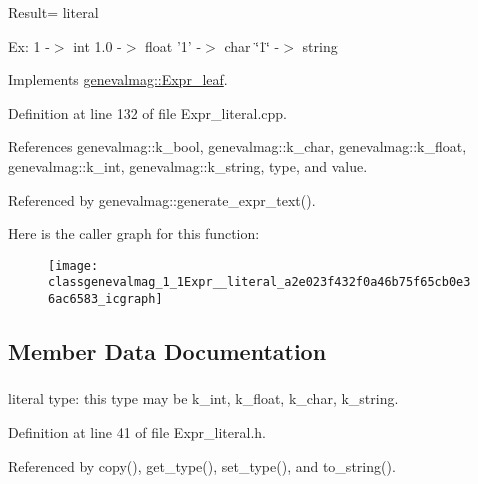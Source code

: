 Result= literal

Ex: 1 -\/$>$ int 1.0 -\/$>$ float '1' -\/$>$ char \char`\"{}1\char`\"{} -\/$>$ string 

Implements \hyperlink{classgenevalmag_1_1Expr__leaf_a96854f59a155b173b6e79007d87bdad5}{genevalmag::Expr\_\-leaf}.



Definition at line 132 of file Expr\_\-literal.cpp.



References genevalmag::k\_\-bool, genevalmag::k\_\-char, genevalmag::k\_\-float, genevalmag::k\_\-int, genevalmag::k\_\-string, type, and value.



Referenced by genevalmag::generate\_\-expr\_\-text().



Here is the caller graph for this function:\nopagebreak
\begin{figure}[H]
\begin{center}
\leavevmode
\texttt{[image: classgenevalmag\_1\_1Expr\_\_literal\_a2e023f432f0a46b75f65cb0e36ac6583\_icgraph]}
\end{center}
\end{figure}




\subsection{Member Data Documentation}
\hypertarget{classgenevalmag_1_1Expr__literal_a9f3d9f0bda8307403f79d3260fa27740}{
\subsubsection[{type}]{}}
\label{classgenevalmag_1_1Expr__literal_a9f3d9f0bda8307403f79d3260fa27740}


literal type: this type may be k\_\-int, k\_\-float, k\_\-char, k\_\-string. 



Definition at line 41 of file Expr\_\-literal.h.



Referenced by copy(), get\_\-type(), set\_\-type(), and to\_\-string().

